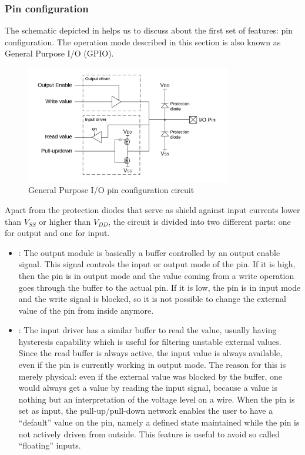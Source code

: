\subsubsection{Pin configuration}
\label{sec:pinconf}

The schematic depicted in \myfig{\ref{fig:pinconf}} helps us to discuss about the first set of features: pin configuration.
The operation mode described in this section is also known as General Purpose I/O (GPIO).

\begin{figure}[h]
\centerline{\includegraphics[width=0.8\textwidth]{res/pinconf}}
\caption{General Purpose I/O pin configuration circuit \label{fig:pinconf}}
\end{figure}

Apart from the protection diodes that serve as shield against input currents lower than $V_{SS}$ or higher than $V_{DD}$,
the circuit is divided into two different parts: one for output and one for input.
\begin{itemize}
	\item {}:
		The output module is basically a buffer controlled by an output enable signal.
		This signal controls the input or output mode of the pin. If it is high, then the pin is in output mode
		and the value coming from a write operation goes through the buffer to the actual pin.
		If it is low, the pin is in input mode and the write signal is blocked, so it is not possible to change the external value of the pin from inside anymore.
	\item {}:
		The input driver has a similar buffer to read the value, usually having hysteresis capability which is useful for filtering unstable external values.
		Since the read buffer is always active, the input value is always available, even if the pin is currently working in output mode.
		The reason for this is merely physical: even if the external value was blocked by the buffer,
		one would always get a value by reading the input signal, because a value is nothing but an interpretation of the voltage level on a wire.
		When the pin is set as input, the pull-up/pull-down network enables the user to have a ``default'' value on the pin,
		namely a defined state maintained while the pin is not actively driven from outside. This feature is useful to avoid so called ``floating'' inputs.
\end{itemize}

